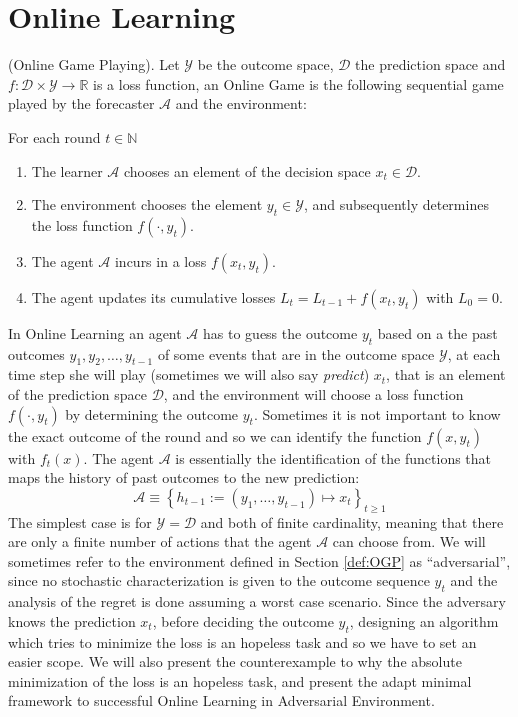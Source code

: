 \section{Online Learning}
\label{sec:OnlineLearning}
\begin{definition}(Online Game Playing).\label{def:OGP}
    Let $\mathcal Y$ be the outcome space, $\mathcal D$ the prediction space and $f:\mathcal D\times\mathcal Y\to \mathbb R$ is a loss function, an Online Game is the following sequential game played by the forecaster $\mathcal A$ and the environment:

    For each round $t\in \mathbb N$
    \begin{enumerate}
        \item The learner $\mathcal A$ chooses an element of the decision space $x_t\in\mathcal D$.
        \item The environment chooses the element $y_t\in\mathcal Y$, and subsequently determines the loss function $f(\cdot,y_t)$.
        \item The agent $\mathcal A$ incurs in a loss $f(x_t,y_t)$.
		\item The agent updates its cumulative losses $L_t=L_{t-1}+f(x_t,y_t)$ with $L_0=0$.
    \end{enumerate}
\end{definition}

In Online Learning an agent $\mathcal A$ has to guess the outcome $y_t$ based on a the past outcomes $y_1,y_2,\ldots,y_{t-1}$ of some events that are in the outcome space $\mathcal Y$, at each time step she will play (sometimes we will also say \emph{predict}) $x_t$, that is an element of the prediction space $\mathcal D$, and the environment will choose a loss function $f(\cdot,y_t)$ by determining the outcome $y_t$.
Sometimes it is not important to know the exact outcome of the round and so we can identify the function $f(x,y_t)$ with $f_t(x)$. The agent $\mathcal A$ is essentially the identification of the functions that maps the history of past outcomes to the new prediction:
$$\mathcal A\equiv\left\{h_{t-1}:=(y_1,\ldots,y_{t-1})\longmapsto x_t\right\}_{t\ge 1} $$
The simplest case is for $\mathcal Y=\mathcal D$ and both of finite cardinality, meaning that there are only a finite number of actions that the agent $\mathcal A$ can choose from. 
We will sometimes refer to the environment defined in Section \ref{def:OGP} as ``adversarial'', since no stochastic characterization is given to the outcome sequence $y_t$ and the analysis of the regret is done assuming a worst case scenario.
Since the adversary knows the prediction $x_t$, before deciding the outcome $y_t$, designing an algorithm which tries to minimize the loss is an hopeless task and so we have to set an easier scope. We will also present the counterexample to why the absolute minimization of the loss is an hopeless task, and present the adapt minimal framework to successful Online Learning in Adversarial Environment.

